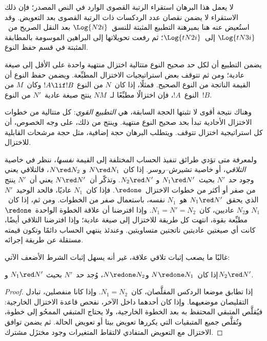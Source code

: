 \documentclass[../../../include/open-logic-section]{subfiles}
\begin{document}
\begin{editorial}
  لا يعمل هذا البرهان استقراء الرتبة القصوى الوارد في النص المصدر؛ فإن ذلك
  الاستقراء لا يضمن نقصان عدد الردكسات ذات الرتبة القصوى بعد التعويض. وقد
  استُعيض عنه هنا بمبرهنة التطبيع المثبتة للنسق~$\Log{N2i}$ بعد النقل
  الصريح من~$\Log{tN3i}$ إلى~$\Log{tN2i}$؛ ثم رفعت تحويلاتها إلى البراهين
  الموسومة بالمطابقة المثبتة في قسم حفظ النوع.
\end{editorial}

يضمن التطبيع أن لكل حد صحيح النوع متتالية اختزال منتهية واحدة على الأقل إلى
صيغة عادية؛ ومن ثم تتوقف بعض استراتيجيات الاختزال المطبِّعة. ويضمن حفظ النوع
أن القيمة الناتجة من النوع الصحيح. فمثلًا، إذا كان~$N$ من النوع
$!A\lif !B$ وكان~$M$ من النوع~$!A$، فإن اختزالًا مطبِّعًا لـ~$NM$ ينتج
صيغة عادية~$N'$ من النوع~$!B$.

وهناك نتيجة أقوى لا تثبتها الحجة السابقة، هي \emph{التطبيع القوي}: كل
متتالية من خطوات الاختزال الأحادية تبدأ بحد صحيح النوع منتهية. وينتج من ذلك،
على وجه الخصوص، أن كل استراتيجية اختزال تتوقف. ويتطلب البرهان حجة إضافية،
مثل حجة مرشحات القابلية للاختزال.

ولمعرفة متى تؤدي طرائق تنفيذ الحساب المختلفة إلى القيمة \emph{نفسها}، ننظر
في خاصية \emph{التلاقي}، أو خاصية تشيرش--روسر. إذا كان~$N\red N_1$ و
$N\red N_2$، فالتلاقي يعني وجود حد~$N'$ بحيث~$N_1\red N'$ و
$N_2\red N'$. وتذكّر أن~$N\red N'$ يعني أن~$N'$ ينتج من صفر أو أكثر من
خطوات الاختزال~$\redone$. فإذا كان~$N_1$ عاديًا، فالحد الوحيد~$N'$ الذي
يحقق~$N_1\red N'$ هو~$N_1$ نفسه، باستعمال صفر من الخطوات. ومن ثم، إذا
كان~$N_1$ و$N_2$ عاديين، كان~$N_1=N'=N_2$. وإذا افترضنا أن علاقة الخطوة
الواحدة~$\redone$ مطبِّعة بقوة، انتهت كل طريقة للاختزال إلى صيغة عادية؛
وإذا افترضنا التلاقي أيضًا، كانت أي صيغتين عاديتين ناتجتين متساويتين. وعندئذ
ينتهي الحساب دائمًا وتكون قيمته مستقلة عن طريقة إجرائه.

غالبًا ما يصعب إثبات تلاقي علاقة، غير أنه يسهل إثبات الشرط الأضعف الآتي:

\begin{prop}
إذا كان~$N\redone N_1$ و$N\redone N_2$، وُجد حد~$N'$ بحيث
$N_1\red N'$ و$N_2\red N'$.
\end{prop}

\begin{proof}
  إذا تطابق موضعا الردكس المقلَّصان، كان~$N_1=N_2$. وإذا كانا منفصلين،
  تبادل التقليصان موضعيهما. وإذا كان أحدهما داخل الآخر، نفحص قاعدة الاختزال
  الخارجية: فيُقلَّص المتبقي المحتفظ به بعد الخطوة الخارجية، ولا يحتاج
  المتبقي الممحُو إلى خطوة، وتُقلَّص جميع المتبقيات التي يكررها تعويض بيتا أو
  تعويض الحالة. ثم يضمن توافق الاختزال مع التعويض المتفادي لالتقاط المتغيرات
  وجود مختزَل مشترك.
\end{proof}
\end{document}
